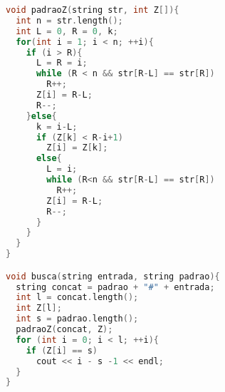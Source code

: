 \begin{lstlisting}[language=C++]
void padraoZ(string str, int Z[]){
  int n = str.length();
  int L = 0, R = 0, k;
  for(int i = 1; i < n; ++i){
    if (i > R){
      L = R = i; 
      while (R < n && str[R-L] == str[R])
        R++;
      Z[i] = R-L;
      R--;
    }else{
      k = i-L; 
      if (Z[k] < R-i+1)
        Z[i] = Z[k]; 
      else{
        L = i;
        while (R<n && str[R-L] == str[R])
          R++;
        Z[i] = R-L;
        R--;
      }
    }
  }
}

void busca(string entrada, string padrao){
  string concat = padrao + "#" + entrada;
  int l = concat.length(); 
  int Z[l];
  int s = padrao.length();
  padraoZ(concat, Z);
  for (int i = 0; i < l; ++i){
    if (Z[i] == s)
      cout << i - s -1 << endl;
  }
}
\end{lstlisting}